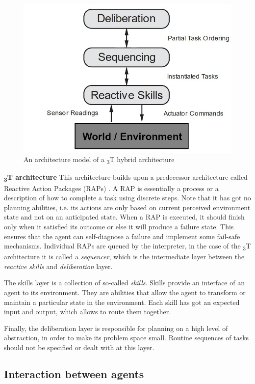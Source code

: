 \documentclass[0main.tex]{subfiles}
\begin{document}
\begin{figure}[htbp]
    \centering
    \includegraphics[width=.65\textwidth]{3t-arch-unified.png}
    \caption{An architecture model of a \textsubscript{3}T hybrid architecture}
    \label{3-arch}
\end{figure}

\textbf{\textsubscript{3}T architecture}\newline
This architecture builds upon a predecessor architecture called Reactive Action Packages (RAPs)
\cite{Firby1987}. A RAP is essentially a process or a description of how to complete a task using
discrete steps. Note that it has got no planning abilities, i.e. its actions are only based on
current perceived environment state and not on an anticipated state. When a RAP is executed, it
should finish only when it satisfied its outcome or else it will produce a failure state. This
ensures that the agent can self-diagnose a failure and implement some fail-safe mechanisms.
Individual RAPs are queued by the interpreter, in the case of the \textsubscript{3}T architecture it
is called a \emph{sequencer}, which is the intermediate layer between the \emph{reactive skills} and 
\emph{deliberation} layer.

The skills layer is a collection of so-called \emph{skills}. Skills provide an interface of an agent 
to its environment. They are abilities that allow the agent to transform or maintain a particular 
state in the environment. Each skill has got an expected input and output, which allows to route them 
together. 

Finally, the deliberation layer is responsible for planning on a high level of abstraction, in 
order to make its problem space small. Routine sequences of tasks should not be specified or 
dealt with at this layer. 


\subsection{Interaction between agents}\label{mas-interaction}
\end{document}
